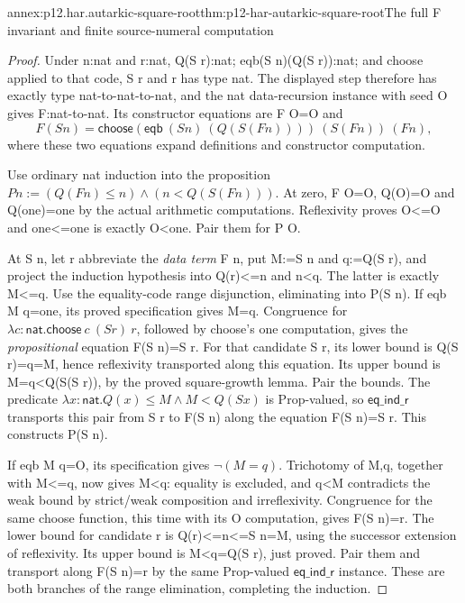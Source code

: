\begin{annexitem}{annex:p12.har.autarkic-square-root}{thm:p12-har-autarkic-square-root}{The full F invariant and finite source-numeral computation}
\begin{proof}
Under n:nat and r:nat, Q(S r):nat; eqb(S n)(Q(S r)):nat;
and choose applied to that code, S r and r has type nat.
The displayed step therefore has exactly type nat-to-nat-to-nat,
and the nat data-recursion instance with seed O gives F:nat-to-nat.
Its constructor equations are F O=O and
\[
 F(S n)=\mathsf{choose}
   (\mathsf{eqb}\ (S n)\ (Q(S(F n))))\ (S(F n))\ (F n),
\]
where these two equations expand definitions and constructor computation.

Use ordinary nat induction into the proposition
\(P n:=(Q(F n)\le n)\wedge(n<Q(S(F n)))\).
At zero, F O=O, Q(O)=O and Q(one)=one by the actual arithmetic
computations. Reflexivity proves O<=O and one<=one is exactly
O<one. Pair them for P O.

At S n, let r abbreviate the \emph{data term} F n, put
M:=S n and q:=Q(S r), and project the induction hypothesis
into Q(r)<=n and n<q. The latter is exactly M<=q.
Use the equality-code range disjunction, eliminating into P(S n).
If eqb M q=one, its proved specification gives M=q.
Congruence for \(\lambda c:\mathsf{nat}.\mathsf{choose}\ c\ (S r)\ r\),
followed by choose's one computation, gives the \emph{propositional}
equation F(S n)=S r. For that candidate S r, its lower bound is
Q(S r)=q=M, hence reflexivity transported along this equation.
Its upper bound is M=q<Q(S(S r)), by the proved square-growth
lemma. Pair the bounds. The predicate
\(\lambda x:\mathsf{nat}.Q(x)\le M\wedge M<Q(S x)\)
is Prop-valued, so \(\mathsf{eq\_ind\_r}\) transports this pair from S r to F(S n)
along the equation F(S n)=S r. This constructs P(S n).

If eqb M q=O, its specification gives \(\neg(M=q)\).
Trichotomy of M,q, together with M<=q, now gives M<q:
equality is excluded, and q<M contradicts the weak bound by
strict/weak composition and irreflexivity. Congruence for the same
choose function, this time with its O computation, gives F(S n)=r.
The lower bound for candidate r is Q(r)<=n<=S n=M, using the
successor extension of reflexivity. Its upper bound is M<q=Q(S r),
just proved. Pair them and transport along F(S n)=r by the same
Prop-valued \(\mathsf{eq\_ind\_r}\) instance. These are both branches of the range
elimination, completing the induction.


\end{proof}
\end{annexitem}
